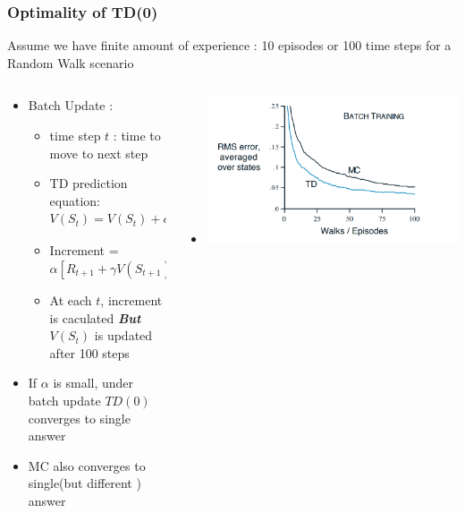 \documentclass{beamer} %
\begin{document}
\begin{frame}
\frametitle{Optimality of TD(0)}
Assume we have finite amount of experience : 10 episodes or 100 time steps for a Random Walk scenario
\begin{columns}
    \begin{column}{.6\textwidth}
     	\begin{block}{}
			\begin{itemize}
				
				\item Batch Update :
				\begin{itemize}
					\item time step $t$ : time to move to next step
					\item TD prediction equation: $V(S_t)  =  V(S_t)  + \alpha[R_{t+1} + \gamma   V(S_{t+1}) -  V (S_t)]$
					\item Increment = $\alpha[R_{t+1} + \gamma   V(S_{t+1}) -  V (S_t)]$
					\item At each $t$, increment is caculated \textbf{\textit{But}} $V(S_t) $ is updated after 100 steps
				\end{itemize}
				\item If $\alpha$ is small, under batch update $TD(0)$ converges to single answer
				\item MC also converges to single(but different ) answer 
			\end{itemize}
		\end{block}
    \end{column}
    \begin{column}{.4\textwidth}
    \begin{block}{}
		\begin{itemize}
			\item \includegraphics[height=.5\textheight, width=\columnwidth]{mctdoptimality.png}

		\end{itemize}
    \end{block}
    \end{column}
\end{columns}
			
\end{frame}
\end{document}
